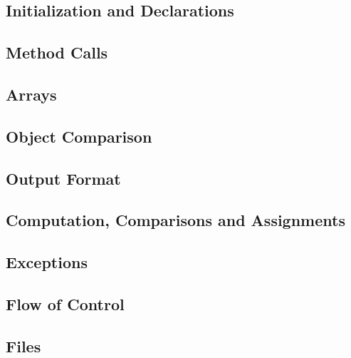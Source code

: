 \subsection{Initialization and Declarations}
\blindtext

\subsection{Method Calls}
\blindtext

\subsection{Arrays}
\blindtext

\subsection{Object Comparison}
\blindtext

\subsection{Output Format}
\blindtext

\subsection{Computation, Comparisons and Assignments}
\blindtext

\subsection{Exceptions}
\blindtext

\subsection{Flow of Control}
\blindtext

\subsection{Files}
\blindtext
